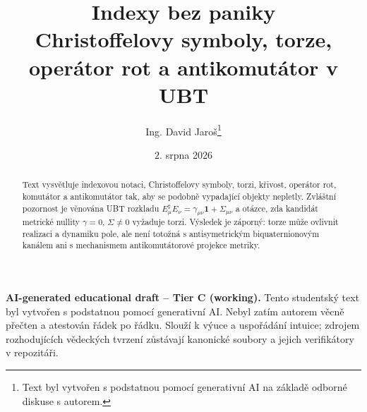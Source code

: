 \documentclass[11pt,a4paper]{article}
\title{Indexy bez paniky\\[0.25em]
\Large Christoffelovy symboly, torze, operátor rot a antikomutátor v UBT}
\author{Ing. David Jaroš\thanks{Text byl vytvořen s podstatnou pomocí generativní AI na základě odborné diskuse s autorem.}}
\date{2. srpna 2026\\[1.0em]\UBTProvenanceTitleLine}
\begin{document}
\maketitle

\begin{tcolorbox}[colback=yellow!8,colframe=black!55,boxrule=0.6pt,arc=1mm]
\small
\textbf{AI-generated educational draft -- Tier C (working).}
Tento studentský text byl vytvořen s podstatnou pomocí generativní AI. Nebyl
zatím autorem věcně přečten a atestován řádek po řádku. Slouží k výuce a
uspořádání intuice; zdrojem rozhodujících vědeckých tvrzení zůstávají kanonické
soubory a jejich verifikátory v repozitáři.
\end{tcolorbox}

\begin{abstract}
Text vysvětluje indexovou notaci, Christoffelovy symboly, torzi, křivost,
operátor rot, komutátor a antikomutátor tak, aby se podobně vypadající objekty
nepletly. Zvláštní pozornost je věnována UBT rozkladu
$E_\mu^\sharp E_\nu=\gamma_{\mu\nu}\mathbf1+\Sigma_{\mu\nu}$ a otázce, zda
kandidát metrické nullity $\gamma=0$, $\Sigma\neq0$ vyžaduje torzi. Výsledek je
záporný: torze může ovlivnit realizaci a dynamiku pole, ale není totožná s
antisymetrickým biquaternionovým kanálem ani s mechanismem antikomutátorové
projekce metriky.
\end{abstract}

\tableofcontents
\newpage

\end{document}
